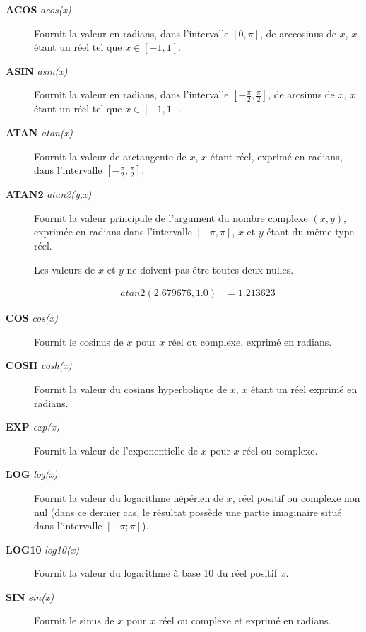 \documentclass[a4paper,twoside]{article}
\begin{document}
\begin{description}
\item[\textbf{ACOS} \emph{acos(x)}] Fournit la valeur en radians, dans l'intervalle $[0,\pi]$, de arccosinus de $x$, $x$ étant un réel tel que $x \in [-1,1]$. 

\item[\textbf{ASIN} \emph{asin(x)}] Fournit la valeur en radians, dans l'intervalle $[-\frac{\pi}{2}, \frac{\pi}{2}]$, de arcsinus de $x$, $x$ étant un réel tel que $x \in [-1,1]$. 

\item[\textbf{ATAN} \emph{atan(x)}] Fournit la valeur de arctangente de $x$, $x$ étant réel, exprimé en radians, dans l'intervalle $[-\frac{\pi}{2}, \frac{\pi}{2}]$.

\item[\textbf{ATAN2} \emph{atan2(y,x)}] Fournit la valeur principale de l'argument
du nombre complexe $(x,y)$, exprimée en radians dans l'intervalle $[-\pi, \pi]$, 
$x$ et $y$ étant du même type réel. 

Les valeurs de $x$ et $y$ ne doivent pas être toutes deux nulles. 
\begin{exemple}
\begin{align}
atan2(2.679676,1.0)  &= 1.213623
\end{align}
\end{exemple}

\item[\textbf{COS} \emph{cos(x)}] Fournit le cosinus de $x$ pour $x$ réel ou complexe, exprimé en radians. 

\item[\textbf{COSH} \emph{cosh(x)}] Fournit la valeur du cosinus hyperbolique de $x$, $x$ étant un réel exprimé en radians.  

\item[\textbf{EXP} \emph{exp(x)}] Fournit la valeur de l'exponentielle de $x$ pour $x$ réel ou complexe.  

\item[\textbf{LOG} \emph{log(x)}] Fournit la valeur  du logarithme népérien de $x$, réel positif ou complexe non nul (dans ce dernier cas, le résultat possède une partie imaginaire situé dans l'intervalle $[-\pi;\pi]$).

\item[\textbf{LOG10} \emph{log10(x)}] Fournit la valeur du logarithme à base 10 du réel positif $x$. 

\item[\textbf{SIN} \emph{sin(x)}] Fournit le sinus de $x$ pour $x$ réel ou complexe et exprimé en radians.  


\end{description}
\end{document}
